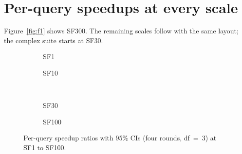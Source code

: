 \documentclass[11pt]{article}
\begin{document}



\appendix
\section{Per-query speedups at every scale}
\label{app:forest}
Figure~\ref{fig:f1} shows SF300. The remaining scales follow with the same
layout; the complex suite starts at SF30. \chartnote

\begin{figure}[h]
\centering
\begin{subfigure}[t]{0.49\linewidth}\centering{}\caption{SF1}\end{subfigure}\hfill
\begin{subfigure}[t]{0.49\linewidth}\centering{}\caption{SF10}\end{subfigure}\\[4pt]
\begin{subfigure}[t]{0.49\linewidth}\centering{}\caption{SF30}\end{subfigure}\hfill
\begin{subfigure}[t]{0.49\linewidth}\centering{}\caption{SF100}\end{subfigure}
\caption{Per-query speedup ratios with 95\% CIs (four rounds, df~=~3) at SF1
to SF100. \chartnote}
\label{fig:f1-all}
\end{figure}

\ifladderran
\end{document}
